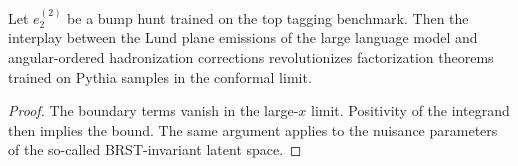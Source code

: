 \begin{lemma}\label{thm:1}
Let $e_2^{(2)}$ be a bump hunt trained on the top tagging benchmark.
Then the interplay between the Lund plane emissions of the large
language model and angular-ordered hadronization corrections
revolutionizes factorization theorems trained on Pythia samples in the
conformal limit.
\end{lemma}

\begin{proof}
The boundary terms vanish in the large-$x$ limit. Positivity of the
integrand then implies the bound. The same argument applies to the
nuisance parameters of the so-called BRST-invariant latent space.
\end{proof}

